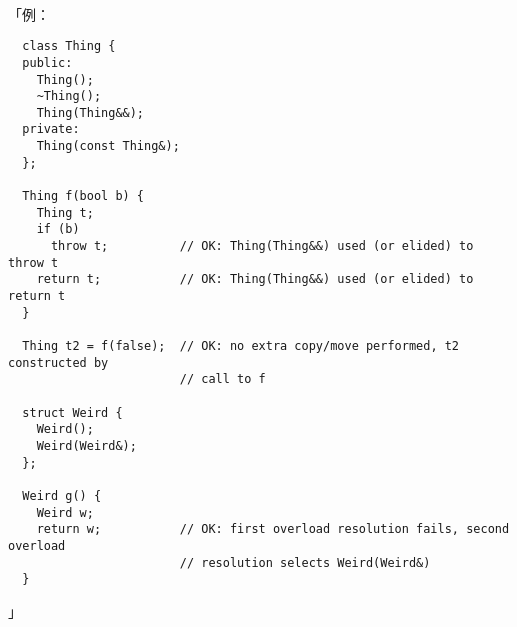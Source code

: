 \paragraph{}
「例：
\begin{lstlisting}
  class Thing {
  public:
    Thing();
    ~Thing();
    Thing(Thing&&);
  private:
    Thing(const Thing&);
  };

  Thing f(bool b) {
    Thing t;
    if (b)
      throw t;          // OK: Thing(Thing&&) used (or elided) to throw t
    return t;           // OK: Thing(Thing&&) used (or elided) to return t
  }

  Thing t2 = f(false);  // OK: no extra copy/move performed, t2 constructed by
                        // call to f

  struct Weird {
    Weird();
    Weird(Weird&);
  };

  Weird g() {
    Weird w;
    return w;           // OK: first overload resolution fails, second overload
                        // resolution selects Weird(Weird&)
  }
\end{lstlisting}」
